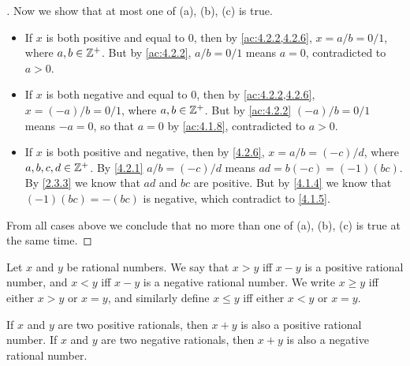 \begin{proof}[]
  Now we show that at most one of (a), (b), (c) is true.
  \begin{itemize}
    \item If \(x\) is both positive and equal to \(0\), then by \cref{ac:4.2.2,4.2.6}, \(x = a / b = 0 / 1\), where \(a, b \in \mathbb{Z}^+\).
          But by \cref{ac:4.2.2}, \(a / b = 0 / 1\) means \(a = 0\), contradicted to \(a > 0\).
    \item If \(x\) is both negative and equal to \(0\), then by \cref{ac:4.2.2,4.2.6}, \(x = (-a) / b = 0 / 1\), where \(a, b \in \mathbb{Z}^+\).
          But by \cref{ac:4.2.2} \((-a) / b = 0 / 1\) means \(-a = 0\), so that \(a = 0\) by \cref{ac:4.1.8}, contradicted to \(a > 0\).
    \item If \(x\) is both positive and negative, then by \cref{4.2.6}, \(x = a / b = (-c) / d\), where \(a, b, c, d \in \mathbb{Z}^+\).
          By \cref{4.2.1} \(a / b = (-c) / d\) means \(ad = b(-c) = (-1)(bc)\).
          By \cref{2.3.3} we know that \(ad\) and \(bc\) are positive.
          But by \cref{4.1.4} we know that \((-1)(bc) = -(bc)\) is negative, which contradict to \cref{4.1.5}.
  \end{itemize}
  From all cases above we conclude that no more than one of (a), (b), (c) is true at the same time.
\end{proof}

\begin{defn}\label{4.2.8}
  Let \(x\) and \(y\) be rational numbers.
  We say that \(x > y\) iff \(x - y\) is a positive rational number, and \(x < y\) iff \(x - y\) is a negative rational number.
  We write \(x \geq y\) iff either \(x > y\) or \(x = y\), and similarly define \(x \leq y\) iff either \(x < y\) or \(x = y\).
\end{defn}

\begin{ac}\label{ac:4.2.6}
  If \(x\) and \(y\) are two positive rationals, then \(x + y\) is also a positive rational number.
  If \(x\) and \(y\) are two negative rationals, then \(x + y\) is also a negative rational number.
\end{ac}

